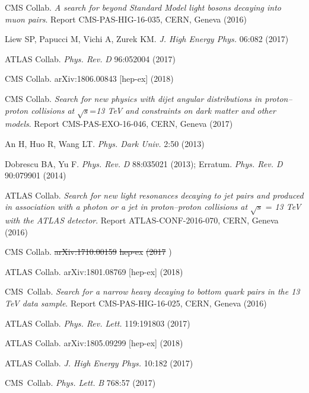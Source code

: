\documentclass{ar-1col}
\providecommand{\DIFadd}[1]{{\protect\color{blue}\uwave{#1}}} %
\providecommand{\DIFdel}[1]{{\protect\color{red}\sout{#1}}}                      %
\providecommand{\DIFaddbegin}{} %
\providecommand{\DIFaddend}{} %
\providecommand{\DIFdelbegin}{} %
\providecommand{\DIFdelend}{} %
\begin{document}
{\begin{thebibliography}{175}
CMS Collab. \textit{A search for beyond Standard Model light bosons decaying into muon pairs}.
Report CMS-PAS-HIG-16-035, CERN, Geneva (2016)

Liew SP, Papucci M, Vichi A, Zurek KM. \textit{J. High Energy Phys.} 06:082 (2017)

{ATLAS Collab}. \textit{Phys. Rev.} \textit{D} 96:052004 (2017)

{CMS Collab.} arXiv:1806.00843 [hep-ex] (2018) 

CMS Collab.\textit{ Search for new physics with dijet angular distributions in proton--proton collisions at} $\sqrt{s}$=\textit{13 TeV and constraints on dark matter and other models}. Report CMS-PAS-EXO-16-046, CERN, Geneva (2017)

An H, Huo R, Wang LT. \textit{Phys. Dark Univ.} 2:50 (2013)

Dobrescu BA, Yu F. \textit{Phys. Rev.} \textit{D} 88:035021 (2013); Erratum. \textit{Phys. Rev. D} 90:079901 (2014)

{ATLAS Collab}. \textit{Search for new light resonances decaying to jet pairs and produced in association with a photon or a jet in proton--proton collisions at}
$\sqrt{s}$ = \textit{13 TeV with the ATLAS detector}. Report ATLAS-CONF-2016-070, CERN, Geneva (2016)

{CMS Collab}. \DIFdelbegin \DIFdel{arXiv:1710.00159 }%
\DIFdel{hep-ex}%
\DIFdel{(2017}\DIFdelend \DIFaddbegin \textit{\DIFadd{J. High Energy Phys.}} \DIFadd{01:097 (2018}\DIFaddend ) 

{ATLAS Collab}. arXiv:1801.08769 [hep-ex] (2018)

{CMS~Collab}. \textit{Search for a narrow heavy decaying to bottom quark pairs in the 13 TeV data sample}.
Report {CMS-PAS-HIG-16-025}, CERN, Geneva (2016)

{ATLAS Collab}. \textit{Phys. Rev. Lett.} 119:191803 (2017)

{ATLAS Collab.} arXiv:1805.09299 [hep-ex] (2018)

{ATLAS Collab}. \textit{J. High Energy Phys.} 10:182 (2017)

{CMS~Collab}. \textit{Phys. Lett.} \textit{B} 768:57 (2017)


\end{thebibliography}}
\end{document}
